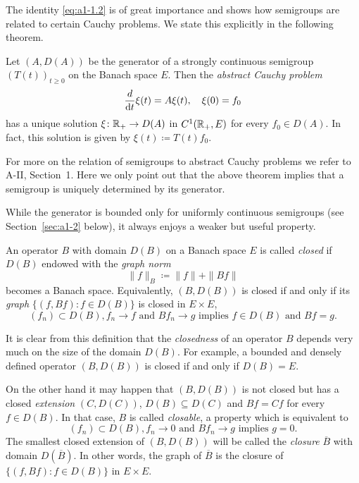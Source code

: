 The identity \eqref{eq:a1-1.2} is of great importance and shows how semigroups are related to certain Cauchy problems.
We state this explicitly in the following theorem.
\begin{theorem}\label{thm:a1-1.7}
Let $(A,D(A))$ be the generator of a strongly continuous semigroup $(T(t))_{t \geq 0}$ on the Banach space $E$.
Then the \emph{abstract Cauchy problem}
\begin{equation}\label{eq:a1-1.5}
\frac{d}{\mathop{}\!\mathrm{d}{t}}\xi(t) = A\xi(t), \quad \xi(0) = f_{0}
\end{equation}
has a unique solution $\xi \colon \mathbb{R}_{+} \to D(A)$ in $C^1(\mathbb{R}_{+},E)$ for every $f_{0} \in D(A)$.
In fact, this solution is given by $\xi(t) \coloneqq T(t)f_{0}$.
\end{theorem}
For more on the relation of semigroups to abstract Cauchy problems we refer to A-II, Section~1.
Here we only point out that the above theorem implies that a semigroup is uniquely determined by its generator.

While the generator is bounded only for uniformly continuous semigroups (see Section~\ref{sec:a1-2} below), it always enjoys a weaker but useful property.
\begin{definition}\label{def:a1-1.8}
An operator $B$ with domain $D(B)$ on a Banach space $E$ is called \emph{closed} if $D(B)$ endowed with the \emph{graph norm}
\[
    \|f\|_{B} \coloneqq \|f\| + \|Bf\|
\]
becomes a Banach space.
Equivalently, $(B,D(B))$ is closed if and only if its \emph{graph} $\{(f,Bf) \colon f \in D(B)\}$ is closed in $E \times E$, \ie
\[
    (f_{n}) \subset D(B), f_{n} \to f \text{ and } Bf_{n} \to g \text{ implies } f \in D(B) \text{ and } Bf = g.
\]
\end{definition}
It is clear from this definition that the \emph{closedness} of an operator $B$ depends very much on the size of the domain $D(B)$.
For example, a bounded and densely defined operator $(B,D(B))$ is closed if and only if $D(B) = E$.

On the other hand it may happen that $(B,D(B))$ is not closed but has a closed \emph{extension} $(C,D(C))$, \ie  $ D(B) \subseteq D(C)$ and $Bf = Cf$ for every $f \in D(B)$.
In that case, $B$ is called \emph{closable}, a property which is equivalent to
\[
    (f_{n}) \subset D(B), f_{n} \to 0 \text{ and } Bf_{n} \to g \text{ implies } g = 0.
\]
The smallest closed extension of $(B,D(B))$ will be called the \emph{closure} $\overline{B}$ with domain $D(\overline{B})$.
In other words, the graph of $\overline{B}$ is the closure of $\{(f,Bf) \colon f \in D(B)\}$ in $E \times E$.

